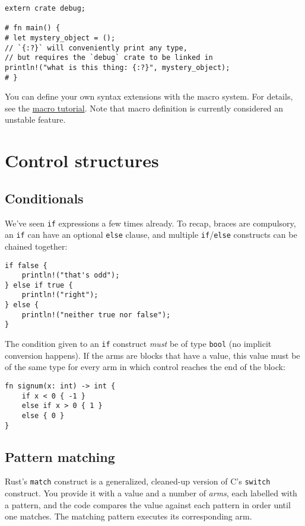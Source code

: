 \documentclass[]{article}
\begin{document}
\begin{verbatim}
extern crate debug;

# fn main() {
# let mystery_object = ();
// `{:?}` will conveniently print any type,
// but requires the `debug` crate to be linked in
println!("what is this thing: {:?}", mystery_object);
# }
\end{verbatim}

You can define your own syntax extensions with the macro system. For
details, see the \href{guide-macros.html}{macro tutorial}. Note that
macro definition is currently considered an unstable feature.

\section{Control structures}\label{control-structures}

\subsection{Conditionals}\label{conditionals}

We've seen \texttt{if} expressions a few times already. To recap, braces
are compulsory, an \texttt{if} can have an optional \texttt{else}
clause, and multiple \texttt{if}/\texttt{else} constructs can be chained
together:

\begin{verbatim}
if false {
    println!("that's odd");
} else if true {
    println!("right");
} else {
    println!("neither true nor false");
}
\end{verbatim}

The condition given to an \texttt{if} construct \emph{must} be of type
\texttt{bool} (no implicit conversion happens). If the arms are blocks
that have a value, this value must be of the same type for every arm in
which control reaches the end of the block:

\begin{verbatim}
fn signum(x: int) -> int {
    if x < 0 { -1 }
    else if x > 0 { 1 }
    else { 0 }
}
\end{verbatim}

\subsection{Pattern matching}\label{pattern-matching}

Rust's \texttt{match} construct is a generalized, cleaned-up version of
C's \texttt{switch} construct. You provide it with a value and a number
of \emph{arms}, each labelled with a pattern, and the code compares the
value against each pattern in order until one matches. The matching
pattern executes its corresponding arm.
\end{document}
